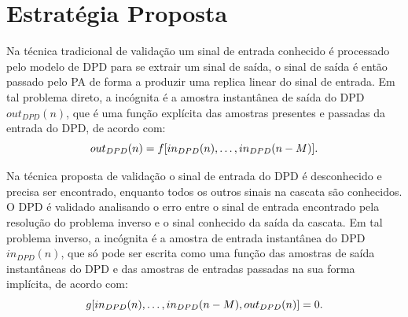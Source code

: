
\section{Estratégia Proposta} \label{sec:estudoii-2}
Na técnica tradicional de validação um sinal de entrada conhecido é processado pelo modelo de DPD para se extrair um sinal de saída, o sinal de saída é então passado pelo PA de forma a produzir uma replica linear do sinal de entrada. Em tal problema direto, a incógnita é a amostra instantânea de saída do DPD $out_{DPD}(n)$, que é uma função explícita das amostras presentes e passadas da entrada do DPD, de acordo com:
\begin{equation}
\small out_{DPD}(n)=f[in_{DPD}(n),\ldots, in_{DPD}(n-M)].
\label{implicit_01}
\end{equation}

Na técnica proposta de validação o sinal de entrada do DPD é desconhecido e precisa ser encontrado, enquanto todos os outros sinais na cascata são conhecidos. O DPD é validado analisando o erro entre o sinal de entrada encontrado pela resolução do problema inverso e o sinal conhecido da saída da cascata. Em tal problema inverso, a incógnita é a amostra de entrada instantânea do DPD $in_{DPD}(n)$, que só pode ser escrita como uma função das amostras de saída instantâneas do DPD e das amostras de entradas passadas na sua forma implícita, de acordo com:
\begin{equation}
\small g[in_{DPD}(n),\ldots, in_{DPD}(n-M), out_{DPD}(n)]=0.
\label{implicit_02}
\end{equation}

